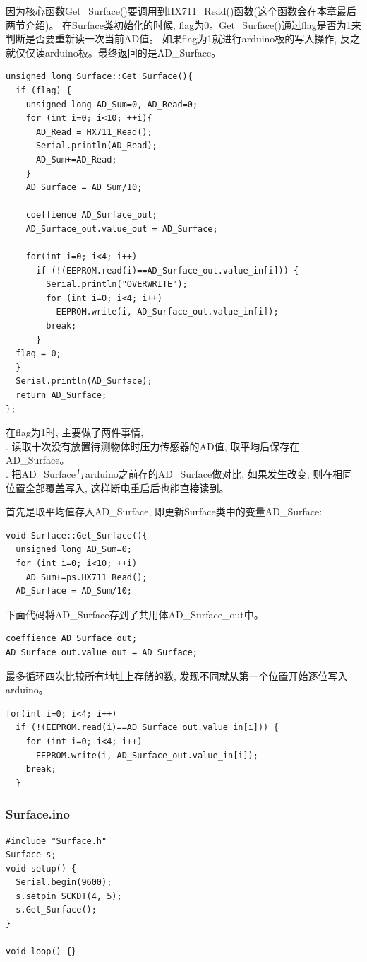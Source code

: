 \documentclass{article}
\begin{document}
因为核心函数Get\_Surface()要调用到HX711\_Read()函数(这个函数会在本章最后两节介绍)。
在Surface类初始化的时候, flag为0。Get\_Surface()通过flag是否为1来判断是否要重新读一次当前AD值。
如果flag为1就进行arduino板的写入操作, 反之就仅仅读arduino板。最终返回的是AD\_Surface。
\begin{lstlisting}
unsigned long Surface::Get_Surface(){
  if (flag) {
    unsigned long AD_Sum=0, AD_Read=0;
    for (int i=0; i<10; ++i){
      AD_Read = HX711_Read();
      Serial.println(AD_Read);
      AD_Sum+=AD_Read;
    } 
    AD_Surface = AD_Sum/10;

    coeffience AD_Surface_out;
    AD_Surface_out.value_out = AD_Surface;

    for(int i=0; i<4; i++)   
      if (!(EEPROM.read(i)==AD_Surface_out.value_in[i])) {
        Serial.println("OVERWRITE");
        for (int i=0; i<4; i++) 
          EEPROM.write(i, AD_Surface_out.value_in[i]);
        break;
      }
  flag = 0;
  }
  Serial.println(AD_Surface);
  return AD_Surface;
};
\end{lstlisting}

在flag为1时, 主要做了两件事情, \\
. 读取十次没有放置待测物体时压力传感器的AD值, 取平均后保存在AD\_Surface。\\
. 把AD\_Surface与arduino之前存的AD\_Surface做对比, 如果发生改变, 则在相同位置全部覆盖写入, 这样断电重启后也能直接读到。

首先是取平均值存入AD\_Surface, 即更新Surface类中的变量AD\_Surface:
\begin{lstlisting}
void Surface::Get_Surface(){
  unsigned long AD_Sum=0;
  for (int i=0; i<10; ++i) 
    AD_Sum+=ps.HX711_Read();
  AD_Surface = AD_Sum/10;
\end{lstlisting}

下面代码将AD\_Surface存到了共用体AD\_Surface\_out中。
\begin{lstlisting}
coeffience AD_Surface_out;
AD_Surface_out.value_out = AD_Surface;
\end{lstlisting}

最多循环四次比较所有地址上存储的数, 发现不同就从第一个位置开始逐位写入arduino。
\begin{lstlisting}
for(int i=0; i<4; i++)
  if (!(EEPROM.read(i)==AD_Surface_out.value_in[i])) {
    for (int i=0; i<4; i++) 
      EEPROM.write(i, AD_Surface_out.value_in[i]);
    break;
  }  
\end{lstlisting}

\subsubsection{Surface.ino}
\begin{lstlisting}
#include "Surface.h"
Surface s;
void setup() {
  Serial.begin(9600);
  s.setpin_SCKDT(4, 5);
  s.Get_Surface();
}

void loop() {}
\end{lstlisting}
\end{document}
